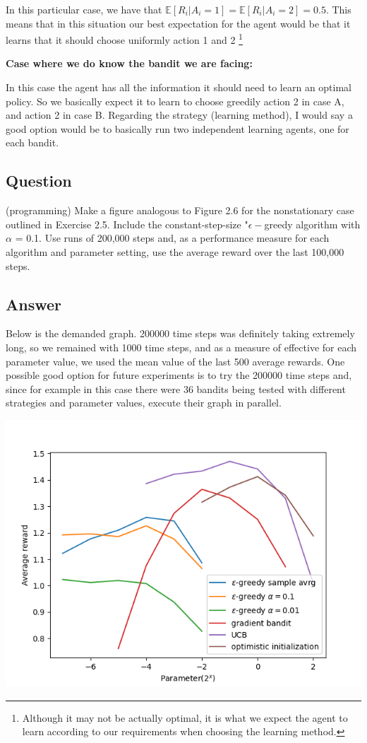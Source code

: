 \documentclass{article}
\begin{document}
In this particular case, we have that $\mathbb{E}[R_i|A_i=1]=\mathbb{E}[R_i|A_i=2]=0.5$. This means that in this situation our best expectation for the agent would be that it learns that it should choose uniformly action 1 and 2 \footnote{Although it may not be actually optimal, it is what we expect the agent to learn according to our requirements when choosing the learning method.}

{\bf Case where we do know the bandit we are facing:}

In this case the agent has all the information it should need to learn an optimal policy. So we basically expect it to learn to choose greedily action 2 in case A, and action 2 in case B. Regarding the strategy (learning method), I would say a good option would be to basically run two independent learning agents, one for each bandit.

    \subsection{Question}

    (programming) Make a figure analogous to Figure 2.6 for the nonstationary case outlined in Exercise 2.5. Include the constant-step-size "$\epsilon-$greedy algorithm with $\alpha$ = 0.1.
    Use runs of 200,000 steps and, as a performance measure for each algorithm and parameter setting, use the average reward over the last 100,000 steps.

    \subsection*{Answer}

    Below is the demanded graph. 200000 time steps was definitely taking extremely long, so we remained with 1000 time steps, and as a measure of effective for each parameter value, we used the mean value of the last 500 average rewards. One possible good option for future experiments is to try the 200000 time steps and, since for example in this case there were 36 bandits being tested with different strategies and parameter values, execute their graph in parallel. 

    \includegraphics[scale=0.5]{figure_e_2_11}
\end{document}
